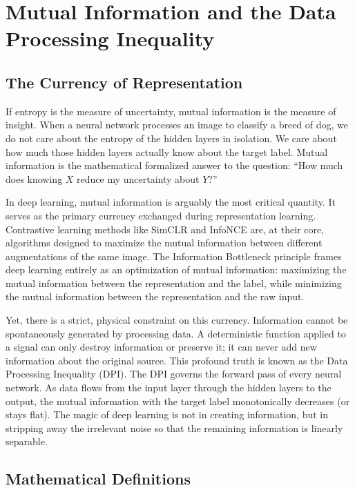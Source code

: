 \chapter{Mutual Information and the Data Processing Inequality}
\label{ch:mutual_information}

\section{The Currency of Representation}

If entropy is the measure of uncertainty, mutual information is the measure of insight. When a neural network processes an image to classify a breed of dog, we do not care about the entropy of the hidden layers in isolation. We care about how much those hidden layers actually know about the target label. Mutual information is the mathematical formalized answer to the question: ``How much does knowing $X$ reduce my uncertainty about $Y$?''

In deep learning, mutual information is arguably the most critical quantity. It serves as the primary currency exchanged during representation learning. Contrastive learning methods like SimCLR and InfoNCE are, at their core, algorithms designed to maximize the mutual information between different augmentations of the same image. The Information Bottleneck principle frames deep learning entirely as an optimization of mutual information: maximizing the mutual information between the representation and the label, while minimizing the mutual information between the representation and the raw input. 

Yet, there is a strict, physical constraint on this currency. Information cannot be spontaneously generated by processing data. A deterministic function applied to a signal can only destroy information or preserve it; it can never add new information about the original source. This profound truth is known as the Data Processing Inequality (DPI). The DPI governs the forward pass of every neural network. As data flows from the input layer through the hidden layers to the output, the mutual information with the target label monotonically decreases (or stays flat). The magic of deep learning is not in creating information, but in stripping away the irrelevant noise so that the remaining information is linearly separable.

\section{Mathematical Definitions}


